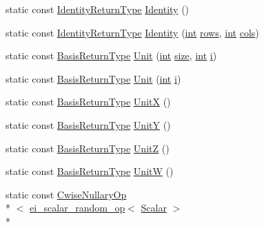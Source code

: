 \begin{DoxyCompactItemize}
\item 
static const \hyperlink{class_matrix_base_a2131370fa10c308c9a39fab0c81ebcd1}{Identity\-Return\-Type} \hyperlink{class_matrix_base_ae099ba9697a9989d827169994bd5728d}{Identity} ()
\item 
static const \hyperlink{class_matrix_base_a2131370fa10c308c9a39fab0c81ebcd1}{Identity\-Return\-Type} \hyperlink{class_matrix_base_adaddacbee198517c26ddde9a94b62674}{Identity} (\hyperlink{ioapi_8h_a787fa3cf048117ba7123753c1e74fcd6}{int} \hyperlink{class_matrix_base_ae82810ba95da637cdf434b4274083723}{rows}, \hyperlink{ioapi_8h_a787fa3cf048117ba7123753c1e74fcd6}{int} \hyperlink{class_matrix_base_abe5381b539f87237647bc651a1ac0364}{cols})
\item 
static const \hyperlink{class_matrix_base_a466099fb1cf0970242cbf8011bb1adfd}{Basis\-Return\-Type} \hyperlink{class_matrix_base_a22ab640939c63705e936fe08733b0097}{Unit} (\hyperlink{ioapi_8h_a787fa3cf048117ba7123753c1e74fcd6}{int} \hyperlink{glext_8h_a014d89bd76f74ef3a29c8f04b473eb76}{size}, \hyperlink{ioapi_8h_a787fa3cf048117ba7123753c1e74fcd6}{int} \hyperlink{uavobjecttemplate_8m_a6f6ccfcf58b31cb6412107d9d5281426}{i})
\item 
static const \hyperlink{class_matrix_base_a466099fb1cf0970242cbf8011bb1adfd}{Basis\-Return\-Type} \hyperlink{class_matrix_base_a33bfe94ac0e26d1ad9f594f4324b59ef}{Unit} (\hyperlink{ioapi_8h_a787fa3cf048117ba7123753c1e74fcd6}{int} \hyperlink{uavobjecttemplate_8m_a6f6ccfcf58b31cb6412107d9d5281426}{i})
\item 
static const \hyperlink{class_matrix_base_a466099fb1cf0970242cbf8011bb1adfd}{Basis\-Return\-Type} \hyperlink{class_matrix_base_a1c268f62db2c09d4c8ae7d74d5d65619}{Unit\-X} ()
\item 
static const \hyperlink{class_matrix_base_a466099fb1cf0970242cbf8011bb1adfd}{Basis\-Return\-Type} \hyperlink{class_matrix_base_a50dc9a15de831fe50f33ebb8e038932d}{Unit\-Y} ()
\item 
static const \hyperlink{class_matrix_base_a466099fb1cf0970242cbf8011bb1adfd}{Basis\-Return\-Type} \hyperlink{class_matrix_base_a072f83c6705430ba5d14604bdaf04e9f}{Unit\-Z} ()
\item 
static const \hyperlink{class_matrix_base_a466099fb1cf0970242cbf8011bb1adfd}{Basis\-Return\-Type} \hyperlink{class_matrix_base_ac8de2c5382567d079f9b5296a1bc4a6f}{Unit\-W} ()
\item 
static const \hyperlink{class_cwise_nullary_op}{Cwise\-Nullary\-Op}\\*
$<$ \hyperlink{structei__scalar__random__op}{ei\-\_\-scalar\-\_\-random\-\_\-op}$<$ \hyperlink{class_matrix_base_a625df8339dc2d816cbc0fd66e7dadaf5}{Scalar} $>$\\*

\end{DoxyCompactItemize}
